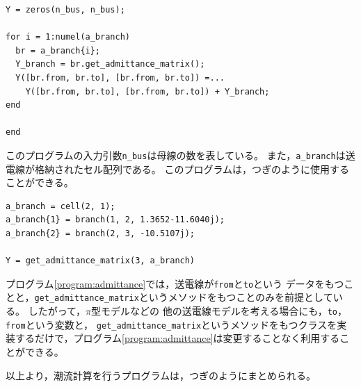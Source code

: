 \documentclass[tombow,dvipdfmx]{corona-a5-1.1}
\begin{document}
\begin{例}[オブジェクト指向によるアドミタンス行列の計算]
\begin{PROGRAMA}[count,title={get\_admittance\_matrix.m}]
\begin{verbatim}
Y = zeros(n_bus, n_bus);

for i = 1:numel(a_branch)
  br = a_branch{i};
  Y_branch = br.get_admittance_matrix();
  Y([br.from, br.to], [br.from, br.to]) =...
    Y([br.from, br.to], [br.from, br.to]) + Y_branch;
end

end
\end{verbatim}
\end{PROGRAMA}

このプログラムの入力引数\verb|n_bus|は母線の数を表している。
また，\verb|a_branch|は送電線が格納されたセル配列である。
このプログラムは，つぎのように使用することができる。

\smallskip
\begin{PROGRAMA}[count,title={main\_admittance\_matrix.m}]\label{program:main_admittance}
\begin{verbatim}
a_branch = cell(2, 1);
a_branch{1} = branch(1, 2, 1.3652-11.6040j);
a_branch{2} = branch(2, 3, -10.5107j);

Y = get_admittance_matrix(3, a_branch)
\end{verbatim}
\end{PROGRAMA}


プログラム\nobreak\ref{program:admittance}では，送電線が\verb|from|と\verb|to|という
データをもつことと，\verb|get_admittance_matrix|というメソッドをもつことのみを前提としている。
したがって，$\pi$型モデルなどの
他の送電線モデルを考える場合にも，\verb|to|，\verb|from|という変数と，
\verb|get_admittance_matrix|というメソッドをもつクラスを実装するだけで，プログラム\nobreak\ref{program:admittance}は変更することなく利用することができる。
\end{例}

以上より，潮流計算を行うプログラムは，つぎのようにまとめられる。
\end{document}
